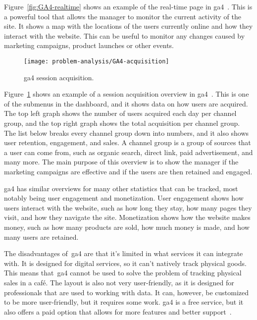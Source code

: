Figure~\ref{fig:GA4-realtime} shows an example of the real-time page in \acrshort{ga4}~\cite{ga4-realtime}.
This is a powerful tool that allows the manager to monitor the current activity of the site.
It shows a map with the locations of the users currently online and how they interact with the website.
This can be useful to monitor any changes caused by marketing campaigns, product launches or other events.

\begin{figure}[H]
    \centering
    \texttt{[image: problem-analysis/GA4-acquisition]}
    \caption{\acrshort{ga4} session acquisition.}\label{fig:GA4-acquisition}
\end{figure}

Figure~\ref{fig:GA4-acquisition} shows an example of a session acquisition overview in \acrshort{ga4}~\cite{ga4-tips}.
This is one of the submenus in the dashboard, and it shows data on how users are acquired.
The top left graph shows the number of users acquired each day per channel group, and the top right graph shows the
total acquisition per channel group.
The list below breaks every channel group down into numbers, and it also shows user retention, engagement, and sales.
A channel group is a group of sources that a user can come from, such as organic search, direct link, paid
advertisement, and many more.
The main purpose of this overview is to show the manager if the marketing campaigns are effective and if the users are
then retained and engaged.

\acrshort{ga4} has similar overviews for many other statistics that can be tracked, most notably being user engagement
and monetization.
User engagement shows how users interact with the website, such as how long they stay, how many pages they visit, and
how they navigate the site.
Monetization shows how the website makes money, such as how many products are sold, how much money is made, and how
many users are retained.

The disadvantages of~\acrlong{ga4} are that it's limited in what services it can integrate with.
It is designed for digital services, so it can't natively track physical goods.
This means that~\acrshort{ga4} cannot be used to solve the problem of tracking physical sales in a café.
The layout is also not very user-friendly, as it is designed for professionals that are used to working with data.
It can, however, be customized to be more user-friendly, but it requires some work.
\acrshort{ga4} is a free service, but it also offers a paid option that allows for more features and better
support~\cite{ga4-360}.
